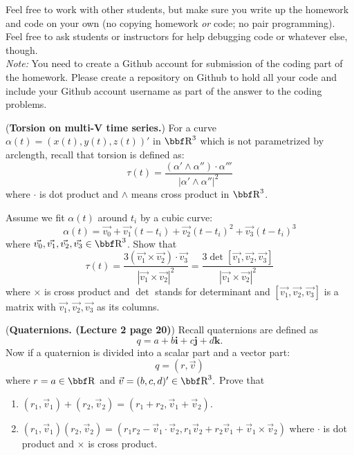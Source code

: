 \documentclass[12pt,letterpaper]{hmcpset}
\begin{document}
Feel free to work with other students, but make sure you write up the homework
and code on your own (no copying homework \textit{or} code; no pair programming).
Feel free to ask students or instructors for help debugging code or whatever else,
though.\\

\textit{Note:} You need to create a Github account for submission of the coding part of the homework. Please create a repository on Github to hold all your code and include your Github account username as part of the answer to the coding problems.

\begin{problem}[1]
(\textbf{Torsion on multi-V time series.}) For a curve $\alpha(t)=(x(t), y(t), z(t))'$ in $\RR^3$ which is not parametrized by arclength, recall that torsion is defined as:
$$\tau(t)=\frac{(\alpha'\wedge\alpha'')\cdot\alpha'''}{|\alpha'\wedge\alpha''|^2}$$
where $\cdot$ is dot product and $\wedge$ means cross product in $\RR^3$.

Assume we fit $\alpha(t)$ around $t_i$ by a cubic curve: 
$$\alpha(t)=\vec{v_0}+\vec{v_1}(t-t_i)+\vec{v_2}(t-t_i)^2+\vec{v_3}(t-t_i)^3$$
where $\vec{v_0},\vec{ v_1},\vec{ v_2}, \vec{ v_3}\in \RR^3$. Show that 
$$\tau(t)=\frac{3(\vec{ v_1}\times \vec{ v_2})\cdot\vec{ v_3}}{|\vec{v_1}\times \vec{v_2}|^2}=\frac{3 \det[\vec{ v_1},\vec{ v_2}, \vec{ v_3}]}{|\vec{v_1}\times \vec{ v_2}|^2}$$
where $\times$ is cross product and $\det$ stands for determinant and $[\vec{ v_1},\vec{ v_2}, \vec{ v_3}]$ is a matrix with $\vec{ v_1},\vec{ v_2}, \vec{ v_3}$ as its columns.
\end{problem}
\begin{solution}
    \vfill
\end{solution}
\newpage



\begin{problem}[2]
(\textbf{Quaternions. (Lecture 2 page 20)}) Recall quaternions are defined as $$q=a+b\boldsymbol i+c\boldsymbol j+d\boldsymbol k.  $$ Now if a quaternion is divided into a scalar part and a vector part: $$q=(r, \vec{v})$$
where $r=a\in \RR$ and $\vec{v}=(b,c,d)'\in\RR^3.$ Prove that
\begin{enumerate}
\item $(r_1, \vec{v}_1)+(r_2, \vec{v}_2)=(r_1+r_2, \vec{v}_1+\vec{v}_2).$
\item  $(r_1, \vec{v}_1)(r_2, \vec{v}_2)=(r_1r_2- \vec{v}_1\cdot\vec{v}_2, r_1\vec{v}_2+r_2\vec{v}_1+\vec{v}_1\times \vec{v}_2)$
where $\cdot$ is dot product and $\times$ is cross product.
\end{enumerate}


\end{problem}
\begin{solution}
    \vfill
\end{solution}
\newpage
\end{document}
